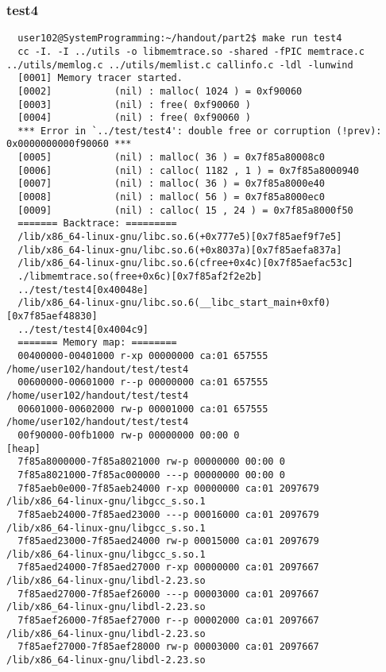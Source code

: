 \documentclass{report}
\begin{document}
\subsubsection{test4}
\begin{verbatim}
  user102@SystemProgramming:~/handout/part2$ make run test4
  cc -I. -I ../utils -o libmemtrace.so -shared -fPIC memtrace.c ../utils/memlog.c ../utils/memlist.c callinfo.c -ldl -lunwind
  [0001] Memory tracer started.
  [0002]           (nil) : malloc( 1024 ) = 0xf90060
  [0003]           (nil) : free( 0xf90060 )
  [0004]           (nil) : free( 0xf90060 )
  *** Error in `../test/test4': double free or corruption (!prev): 0x0000000000f90060 ***
  [0005]           (nil) : malloc( 36 ) = 0x7f85a80008c0
  [0006]           (nil) : calloc( 1182 , 1 ) = 0x7f85a8000940
  [0007]           (nil) : malloc( 36 ) = 0x7f85a8000e40
  [0008]           (nil) : malloc( 56 ) = 0x7f85a8000ec0
  [0009]           (nil) : calloc( 15 , 24 ) = 0x7f85a8000f50
  ======= Backtrace: =========
  /lib/x86_64-linux-gnu/libc.so.6(+0x777e5)[0x7f85aef9f7e5]
  /lib/x86_64-linux-gnu/libc.so.6(+0x8037a)[0x7f85aefa837a]
  /lib/x86_64-linux-gnu/libc.so.6(cfree+0x4c)[0x7f85aefac53c]
  ./libmemtrace.so(free+0x6c)[0x7f85af2f2e2b]
  ../test/test4[0x40048e]
  /lib/x86_64-linux-gnu/libc.so.6(__libc_start_main+0xf0)[0x7f85aef48830]
  ../test/test4[0x4004c9]
  ======= Memory map: ========
  00400000-00401000 r-xp 00000000 ca:01 657555                             /home/user102/handout/test/test4
  00600000-00601000 r--p 00000000 ca:01 657555                             /home/user102/handout/test/test4
  00601000-00602000 rw-p 00001000 ca:01 657555                             /home/user102/handout/test/test4
  00f90000-00fb1000 rw-p 00000000 00:00 0                                  [heap]
  7f85a8000000-7f85a8021000 rw-p 00000000 00:00 0
  7f85a8021000-7f85ac000000 ---p 00000000 00:00 0
  7f85aeb0e000-7f85aeb24000 r-xp 00000000 ca:01 2097679                    /lib/x86_64-linux-gnu/libgcc_s.so.1
  7f85aeb24000-7f85aed23000 ---p 00016000 ca:01 2097679                    /lib/x86_64-linux-gnu/libgcc_s.so.1
  7f85aed23000-7f85aed24000 rw-p 00015000 ca:01 2097679                    /lib/x86_64-linux-gnu/libgcc_s.so.1
  7f85aed24000-7f85aed27000 r-xp 00000000 ca:01 2097667                    /lib/x86_64-linux-gnu/libdl-2.23.so
  7f85aed27000-7f85aef26000 ---p 00003000 ca:01 2097667                    /lib/x86_64-linux-gnu/libdl-2.23.so
  7f85aef26000-7f85aef27000 r--p 00002000 ca:01 2097667                    /lib/x86_64-linux-gnu/libdl-2.23.so
  7f85aef27000-7f85aef28000 rw-p 00003000 ca:01 2097667                    /lib/x86_64-linux-gnu/libdl-2.23.so

\end{verbatim}
\end{document}
